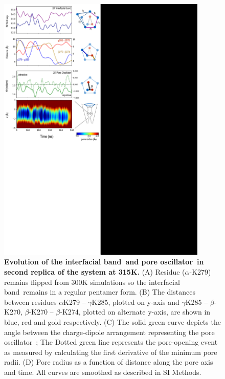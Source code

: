 \documentclass[9pt,onecolumn,oneside,lineno]{pnas-new}
\newcommand{\fivering}{interfacial band~}
\newcommand{\triad}{pore oscillator~}
\begin{document}
\begin{figure}
\begin{center}
\includegraphics[width = 100mm]{figures_2/pore_opening_events_M315_2.pdf}
\end{center}
\caption{{\bf Evolution of the \fivering and \triad in second replica of the \MT system at 315K.} (A)  Residue ($\alpha$-K279) remains flipped from 300K simulations so the \fivering remains in a regular pentamer form.  (B) The distances between residues $\alpha$K279 -- $\gamma$K285, plotted on y-axis and  $\gamma$K285 -- $\beta$-K270, $\beta$-K270 -- $\beta$-K274, plotted on alternate y-axis, are shown in blue, red and gold respectively. (C) The solid green curve depicts the angle between the charge-dipole arrangement representing the \triad; The Dotted green line represents the pore-opening event as measured by calculating the  first derivative of the minimum pore radii. (D) Pore radius as a function of distance along the pore axis and time.  All curves are smoothed as described in SI Methods.}
\label{fig:M315_2}
\end{figure}
\end{document}
